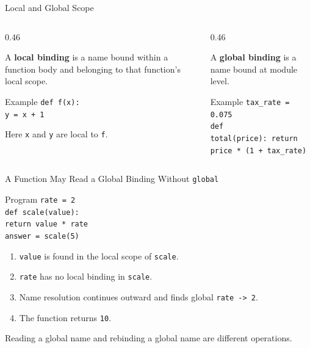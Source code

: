 \documentclass[aspectratio=169,10pt]{beamer}
\begin{document}
\begin{frame}{Local and Global Scope}
  \begin{columns}[T,onlytextwidth]
    \begin{column}{0.46\textwidth}
      \begin{cpdefinition}
        A \textbf{local binding} is a name bound within a function body and belonging to that function's local scope.
      \end{cpdefinition}

      \begin{block}{Example}
        \texttt{def f(x):}\\
        \hspace*{0.20in}\texttt{y = x + 1}
      \end{block}

      Here \texttt{x} and \texttt{y} are local to \texttt{f}.
    \end{column}

    \begin{column}{0.46\textwidth}
      \begin{cpdefinition}
        A \textbf{global binding} is a name bound at module level.
      \end{cpdefinition}

      \begin{block}{Example}
        \texttt{tax\_rate = 0.075}\\[0.08in]
        \texttt{def total(price):}\
        \hspace*{0.20in}\texttt{return price * (1 + tax\_rate)}
      \end{block}
    \end{column}
  \end{columns}
\end{frame}

\begin{frame}{A Function May Read a Global Binding Without \texttt{global}}
  \begin{block}{Program}
    \texttt{rate = 2}\\[0.06in]
    \texttt{def scale(value):}\\
    \hspace*{0.20in}\texttt{return value * rate}\\[0.08in]
    \texttt{answer = scale(5)}
  \end{block}

  \begin{enumerate}
    \item \texttt{value} is found in the local scope of \texttt{scale}.
    \item \texttt{rate} has no local binding in \texttt{scale}.
    \item Name resolution continues outward and finds global \texttt{rate -> 2}.
    \item The function returns \texttt{10}.
  \end{enumerate}

  \begin{keyidea}
    Reading a global name and rebinding a global name are different operations.
  \end{keyidea}
\end{frame}
\end{document}

